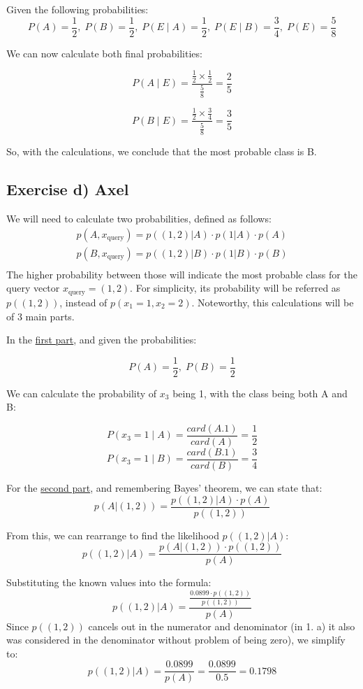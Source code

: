 \documentclass{article}
\begin{document}
Given the following probabilities:
\[
P(A) = \frac{1}{2},\;P(B) = \frac{1}{2},\;P(E \mid A ) = \frac{1}{2},\;P(E \mid B) = \frac{3}{4},\;P(E) = \frac{5}{8}
\]

We can now calculate both final probabilities:

\[P(A \mid E) = \frac{\frac{1}{2} \times \frac{1}{2}}{\frac{5}{8}} = \frac{2}{5}\]

\[P(B \mid E) = \frac{\frac{1}{2} \times \frac{3}{4}}{\frac{5}{8}} = \frac{3}{5}\]

So, with the calculations, we conclude that the most probable class is B.

\subsection{Exercise d) Axel}
We will need to calculate two probabilities, defined as follows:
\begin{align*}
    p(A, x_\text{query}) = p((1,2) | A) \cdot p(1 | A) \cdot p(A) \\
    p(B, x_\text{query}) = p((1,2) | B) \cdot p(1 | B) \cdot p(B) \\
\end{align*}
The higher probability between those will indicate the most probable class for the query vector \( x_\text{query} = (1,2) \). For simplicity, its probability will be referred as \(p((1,2))\), instead of \(p(x_1 = 1, x_2 = 2)\).
Noteworthy, this calculations will be of 3 main parts.

\bigskip
In the \underline{first part}, and given the probabilities:

\[
P(A) = \frac{1}{2},\;P(B) = \frac{1}{2}
\]

We can calculate the probability of \( x_3 \) being 1, with the class being both A and B:

\[
P(x_3 = 1 \mid A) = \frac{card(A.1)}{card(A)} = \frac{1}{2}
\]
\[
P(x_3 = 1 \mid B) = \frac{card(B.1)}{card(B)} = \frac{3}{4}
\]
\bigskip

For the \underline{second part}, and remembering Bayes' theorem, we can state that:
\[
p(A | (1,2)) = \frac{p((1,2) | A) \cdot p(A)}{p((1,2))}
\]

From this, we can rearrange to find the likelihood \( p((1,2) | A) \):
\[
p((1,2) | A) = \frac{p(A | (1,2)) \cdot p((1,2))}{p(A)}
\]

Substituting the known values into the formula:
\[
p((1,2) | A) = \frac{\frac{0.0899 \cdot p((1,2))}{p((1,2))}}{p(A)}
\]
Since \( p((1,2)) \) cancels out in the numerator and denominator (in 1. a) it also was considered in the denominator without problem of being zero), we simplify to:
\[
p((1,2) | A) = \frac{0.0899}{p(A)} = \frac{0.0899}{0.5} = 0.1798
\]
\end{document}
